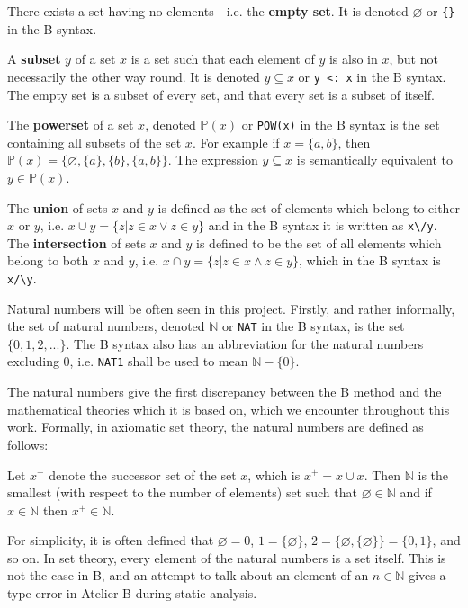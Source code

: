 \documentclass[12pt,journal,duplex]{IEEEtran}
\begin{document}
	There exists a set having no elements - i.e. the \textbf{empty set}. It is denoted $\varnothing$ or \texttt{\{\}} in the B syntax.

	A \textbf{subset} $y$ of a set $x$ is a set such that each element of $y$ is also in $x$, but not necessarily the other way round. It is denoted $y \subseteq x$ or \texttt{y <: x} in the B syntax. The empty set is a subset of every set, and that every set is a subset of itself.

	The \textbf{powerset} of a set $x$, denoted $\mathbb{P}(x)$ or \texttt{POW(x)} in the B syntax is the set containing all subsets of the set $x$. For example if $x = \{a,b\}$, then $\mathbb{P}(x) = \{\varnothing, \{a\}, \{b\}, \{a,b\}\}$. The expression $y \subseteq x$ is semantically equivalent to $y \in \mathbb{P}(x)$.

	The \textbf{union} of sets $x$ and $y$ is defined as the set of elements which belong to either $x$ or $y$, i.e. $x \cup y = \{z| z \in x \vee z \in y\}$ and in the B syntax it is written as \verb|x\/y|. The \textbf{intersection} of sets $x$ and $y$ is defined to be the set of all elements which belong to both $x$ and $y$, i.e. $x \cap y = \{z | z \in x \wedge z \in y \}$, which in the B syntax is \verb|x/\y|.

	Natural numbers will be often seen in this project. Firstly, and rather informally, the set of natural numbers, denoted $\mathbb{N}$ or \texttt{NAT} in the B syntax, is the set $\{0,1,2, ...\}$. The B syntax also has an abbreviation for the natural numbers excluding 0, i.e. \texttt{NAT1} shall be used to mean $\mathbb{N}-\{0\}$.

	The natural numbers give the first discrepancy between the B method and the mathematical theories which it is based on, which we encounter throughout this work. Formally, in axiomatic set theory, the natural numbers are defined as follows:

	Let $x^+$ denote the successor set of the set $x$, which is $x^+ = x \cup {x}$. Then $\mathbb{N}$ is the smallest (with respect to the number of elements) set such that $\varnothing \in \mathbb{N}$ and if $x \in \mathbb{N}$ then $x^+ \in \mathbb{N}$.

	For simplicity, it is often defined that $\varnothing = 0$, $1 = \{\varnothing \}$, $2 = \{\varnothing , \{\varnothing\} \} = \{0,1\}$, and so on. In set theory, every element of the natural numbers is a set itself. This is not the case in B, and an attempt to talk about an element of an $n \in \mathbb{N}$ gives a type error in Atelier B during static analysis.
\end{document}
